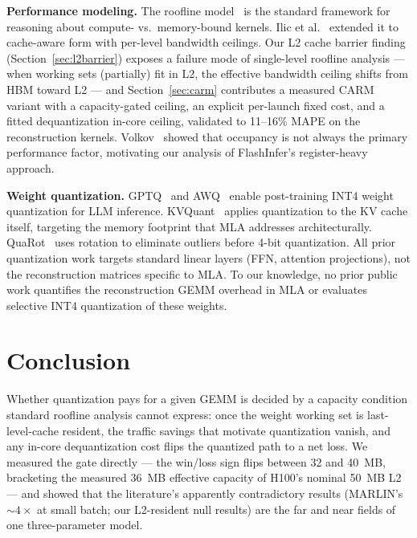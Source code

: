 \documentclass[10pt,twocolumn]{article}
\begin{document}
\textbf{Performance modeling.}  The roofline model~\cite{roofline} is the standard framework for reasoning about compute- vs.\ memory-bound kernels.  Ilic et al.~\cite{carm} extended it to cache-aware form with per-level bandwidth ceilings.  Our L2 cache barrier finding (Section~\ref{sec:l2barrier}) exposes a failure mode of single-level roofline analysis --- when working sets (partially) fit in L2, the effective bandwidth ceiling shifts from HBM toward L2 --- and Section~\ref{sec:carm} contributes a measured CARM variant with a capacity-gated ceiling, an explicit per-launch fixed cost, and a fitted dequantization in-core ceiling, validated to 11--16\% MAPE on the reconstruction kernels.  Volkov~\cite{volkov2010} showed that occupancy is not always the primary performance factor, motivating our analysis of FlashInfer's register-heavy approach.

\textbf{Weight quantization.}  GPTQ~\cite{gptq} and AWQ~\cite{awq} enable post-training INT4 weight quantization for LLM inference.  KVQuant~\cite{kvquant} applies quantization to the KV cache itself, targeting the memory footprint that MLA addresses architecturally.  QuaRot~\cite{quarot} uses rotation to eliminate outliers before 4-bit quantization.  All prior quantization work targets standard linear layers (FFN, attention projections), not the reconstruction matrices specific to MLA.  To our knowledge, no prior public work quantifies the reconstruction GEMM overhead in MLA or evaluates selective INT4 quantization of these weights.

\section{Conclusion}

Whether quantization pays for a given GEMM is decided by a capacity condition standard roofline analysis cannot express: once the weight working set is last-level-cache resident, the traffic savings that motivate quantization vanish, and any in-core dequantization cost flips the quantized path to a net loss.  We measured the gate directly --- the win/loss sign flips between 32 and 40~MB, bracketing the measured 36~MB effective capacity of H100's nominal 50~MB L2 --- and showed that the literature's apparently contradictory results (MARLIN's ${\sim}4\times$ at small batch; our L2-resident null results) are the far and near fields of one three-parameter model.
\end{document}
